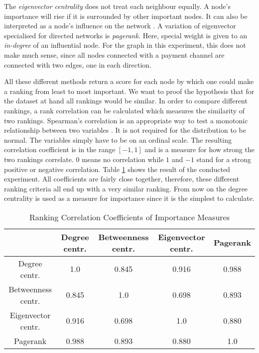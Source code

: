\documentclass[final]{fhnwreport}       %
\begin{document}
The \emph{eigenvector centrality} does not treat each neighbour equally. A node's importance will rise if it is surrounded by other important nodes. It can also be interpreted as a node's influence on the network \citep{golbeck_analyzing_2013}. A variation of eigenvector specialised for directed networks is \emph{pagerank}. Here, special weight is given to an \emph{in-degree} of an influential node. For the graph in this experiment, this does not make much sense, since all nodes connected with a payment channel are connected with two edges, one in each direction.

All these different methods return a score for each node by which one could make a ranking from least to most important. We want to proof the hypothesis that for the dataset at hand all rankings would be similar. In order to compare different rankings, a rank correlation can be calculated which measures the similarity of two rankings. Spearman's correlation is an appropriate way to test a monotonic relationship between two variables \citep{noauthor_spearmans_nodate}. It is not required for the distribution to be normal. The variables simply have to be on an ordinal scale. The resulting correlation coefficient is in the range $[-1,1]$ and is a measure for how strong the two rankings correlate. $0$ means no correlation while $1$ and $-1$ stand for a strong positive or negative correlation. Table \ref{tab:spearman} shows the result of the conducted experiment. All coefficients are fairly close together, therefore, these different ranking criteria all end up with a very similar ranking. From now on the degree centrality is used as a measure for importance since it is the simplest to calculate.

\begin{table}[H]
\centering
\begin{tabular}{c | cccc} 
{} & {Degree centr.} & {Betweenness centr.} & {Eigenvector centr.} & {Pagerank} \\ \hline 
{Degree centr.} & {1.0} & {0.845} & {0.916} & {0.988} \\ 
{Betweenness centr.} & {0.845} & {1.0} & {0.698} & {0.893}\\
{Eigenvector centr.} & {0.916} & {0.698} & {1.0} & {0.880} \\
{Pagerank} & {0.988} & {0.893} & {0.880} & {1.0} \\
\end{tabular}
\caption{Ranking Correlation Coefficients of Importance Measures}
\label{tab:spearman}
\end{table}
\end{document}
